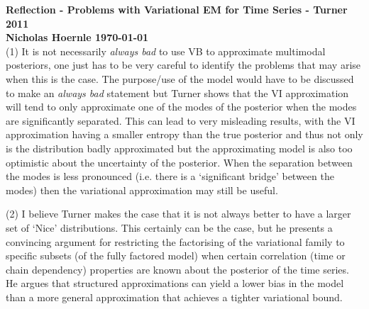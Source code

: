 \documentclass[twoside]{article}
\begin{document}
\textbf{Reflection - Problems with Variational EM for Time Series - Turner 2011}\\
\textbf{Nicholas Hoernle \hfill \today}\\



(1) It is not necessarily \textit{always bad} to use VB to approximate multimodal posteriors, one just has to be very careful to identify the problems that may arise when this is the case. The purpose/use of the model would have to be discussed to make an \textit{always bad} statement but Turner shows that the VI approximation will tend to only approximate one of the modes of the posterior when the modes are significantly separated. This can lead to very misleading results, with the VI approximation having a smaller entropy than the true posterior and thus not only is the distribution badly approximated but the approximating model is also too optimistic about the uncertainty of the posterior. When the separation between the modes is less pronounced (i.e. there is a `significant bridge' between the modes) then the variational approximation may still be useful.

(2) I believe Turner makes the case that it is not always better to have a larger set of `Nice' distributions. This certainly can be the case, but he presents a convincing argument for restricting the factorising of the variational family to specific subsets (of the fully factored model) when certain correlation (time or chain dependency) properties are known about the posterior of the time series. He argues that structured approximations can yield a lower bias in the model than a more general approximation that achieves a tighter variational bound.
\end{document}
